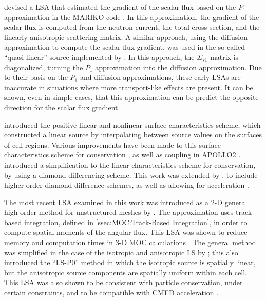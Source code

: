 {{    \citeauthor{Petkov1998} devised a \ac{LSA} that estimated the gradient of the scalar flux based on the $P_1$ approximation in the MARIKO code \cite{Petkov1998,Petkov1999}.
    In this approximation, the gradient of the scalar flux is computed from the neutron current, the total cross section, and the linearly anisotropic scattering matrix.
    A similar approach, using the diffusion approximation to compute the scalar flux gradient, was used in the so called ``quasi-linear'' source implemented by \citet{Rabiti2009}.
    In this approach, the $\Sigma_{s1}$ matrix is diagonalized, turning the $P_1$ approximation into the diffusion approximation.
    Due to their basis on the $P_1$ and diffusion approximations, these early \acp{LSA} are inaccurate in situations where more transport-like effects are present.
    It can be shown, even in simple cases, that this approximation can be predict the opposite direction for the scalar flux gradient.

    \citet{Santandrea2002} introduced the positive linear and nonlinear surface characteristics scheme, which constructed a linear source by interpolating between source values on the surfaces of cell regions.
    Various improvements have been made to this surface characteristics scheme for conservation \cite{Santandrea2002}, as well as coupling in APOLLO2 \cite{Santandrea2008}.
    \citet{LeTellier2006} introduced a simplification to the linear characteristics scheme for conservation, by using a diamond-differencing scheme.
    This work was extended by \citet{Hebert2016}, to include higher-order diamond difference schemes, as well as allowing for acceleration \cite{Hebert2017}.

    The most recent \ac{LSA} examined in this work was introduced as a 2-D general high-order method for unstructured meshes by \citet{Masiello2009}.
    The approximation uses track-based integration, defined in \cref{ssec:MOC:Track-Based Integration}, in order to compute spatial moments of the angular flux.
    This \ac{LSA} was shown to reduce memory and computation times in 3-D \ac{MOC} calculations \cite{Chai2009}.
    The general method was simplified in the case of the isotropic and anisotropic \ac{LS} by \citet{Ferrer2016}; this also introduced the ``LS-P0'' method in which the isotropic source is spatially linear, but the anisotropic source components are spatially uniform within each cell.
    This \ac{LSA} was also shown to be consistent with particle conservation, under certain constraints, and to be compatible with \ac{CMFD} acceleration \cite{Ferrer2018}.

}}
